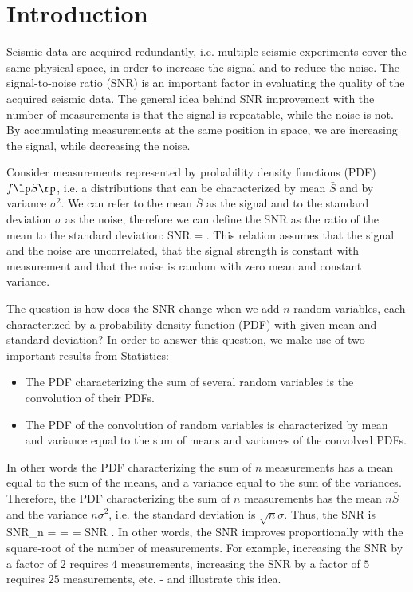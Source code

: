 \section{Introduction}

Seismic data are acquired redundantly, i.e. multiple seismic
experiments cover the same physical space, in order to increase the
signal and to reduce the noise. The signal-to-noise ratio (SNR) is an
important factor in evaluating the quality of the acquired seismic
data. The general idea behind SNR improvement with the number of
measurements is that the signal is repeatable, while the noise is
not. By accumulating measurements at the same position in space, we
are increasing the signal, while decreasing the noise.

Consider measurements represented by probability density functions
(PDF) $f\lp S \rp$, i.e. a distributions that can be characterized by
mean $\bar{S}$ and by variance $\sigma^2$. We can refer to the mean
$\bar{S}$ as the signal and to the standard deviation $\sigma$ as the
noise, therefore we can define the SNR as the ratio of the mean to the
standard deviation:
%
\beq
SNR =  \;.
\eeq
%
This relation assumes that the signal and the noise are uncorrelated,
that the signal strength is constant with measurement and that the
noise is random with zero mean and constant variance.

The question is how does the SNR change when we add $n$ random
variables, each characterized by a probability density function (PDF)
with given mean and standard deviation? In order to answer this
question, we make use of two important results from Statistics:
\begin{itemize}
\item The PDF characterizing the sum of several random variables is
  the convolution of their PDFs.
\item The PDF of the convolution of random variables is characterized
  by mean and variance equal to the sum of means and variances of the
  convolved PDFs.
\end{itemize}
In other words the PDF characterizing the sum of $n$ measurements has
a mean equal to the sum of the means, and a variance equal to the sum
of the variances. Therefore, the PDF characterizing the sum of $n$
measurements has the mean $n\bar{S}$ and the variance $n\sigma^2$,
i.e. the standard deviation is $\sqrt{n} \sigma$. Thus, the SNR is
%
\beq
SNR_n = 
      =  
      = SNR  \;.
\eeq
%
In other words, the SNR improves proportionally with the square-root
of the number of measurements. For example, increasing the SNR by a
factor of $2$ requires $4$ measurements, increasing the SNR by a
factor of $5$ requires $25$ measurements,
etc. - and  illustrate this idea. 

